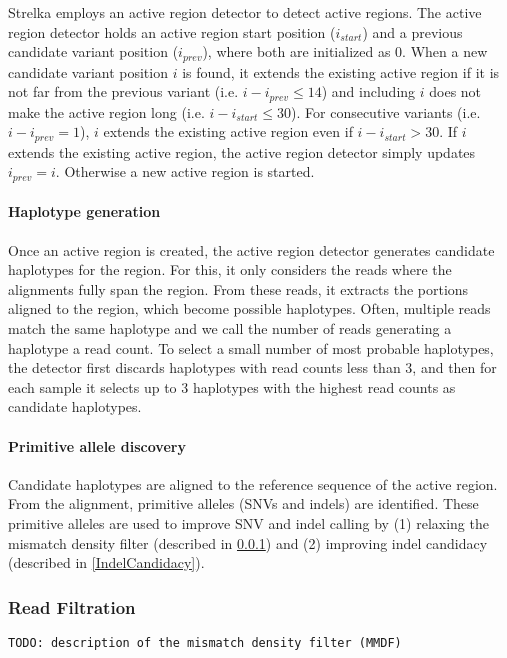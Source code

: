\documentclass{article}
\begin{document}
Strelka employs an active region detector to detect active regions. The active region detector holds an active region start position ($i_{start}$) and a previous candidate variant position ($i_{prev}$), where both are initialized as 0. When a new candidate variant position $i$ is found, it extends the existing active region if it is not far from the previous variant (i.e. $i - i_{prev} \leq 14$) and including $i$ does not make the active region long (i.e. $i - i_{start} \leq 30$). For consecutive variants (i.e. $i - i_{prev} = 1$), $i$ extends the existing active region even if $i - i_{start} > 30$. If $i$ extends the existing active region, the active region detector simply updates $i_{prev} = i$. Otherwise a new active region is started.

\paragraph{Haplotype generation}
Once an active region is created, the active region detector generates candidate haplotypes for the region. For this, it only considers the reads where the alignments fully span the region. From these reads, it extracts the portions aligned to the region, which become possible haplotypes. Often, multiple reads match the same haplotype and we call the number of reads generating a haplotype a read count. To select a small number of most probable haplotypes, the detector first discards haplotypes with read counts less than 3, and then for each sample it selects up to 3 haplotypes with the highest read counts as candidate haplotypes.


\paragraph{Primitive allele discovery}
Candidate haplotypes are aligned to the reference sequence of the active region. From the alignment, primitive alleles (SNVs and indels) are identified. These primitive alleles are used to improve SNV and indel calling by (1) relaxing the mismatch density filter (described in \ref{ReadFiltration}) and (2) improving indel candidacy (described in \ref{IndelCandidacy}).

\subsubsection{Read Filtration} \label{ReadFiltration}

{\tt TODO: description of the mismatch density filter (MMDF)}
\end{document}

